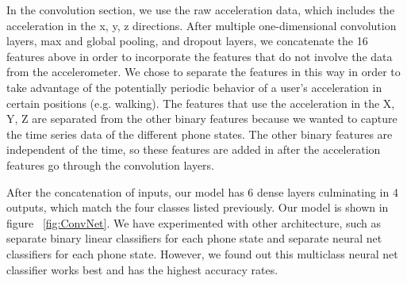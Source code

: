 In the convolution section, we use the raw acceleration data, which includes the acceleration in the x, y, z directions. 
After multiple one-dimensional convolution layers, max and global pooling, and dropout layers, 
we concatenate the 16 features above in order to incorporate the features that do not involve the data from the accelerometer. 
We chose to separate the features in this way in order to take advantage of the potentially periodic behavior of a user's acceleration in certain positions (e.g. walking).
The features that use the acceleration in the X, Y, Z are separated from the other binary features because we wanted to capture the time series data of the different phone states.
The other binary features are independent of the time, so these features are added in after the acceleration features go through the convolution layers.  

After the concatenation of inputs, our model has 6 dense layers culminating in  4 outputs, which match the four classes listed previously. 
Our model is shown in figure ~\ref{fig:ConvNet}.
We have experimented with other architecture, such as separate binary linear classifiers for each phone state and separate neural net classifiers for each phone state.
However, we found out this multiclass neural net classifier works best and has the highest accuracy rates. 
